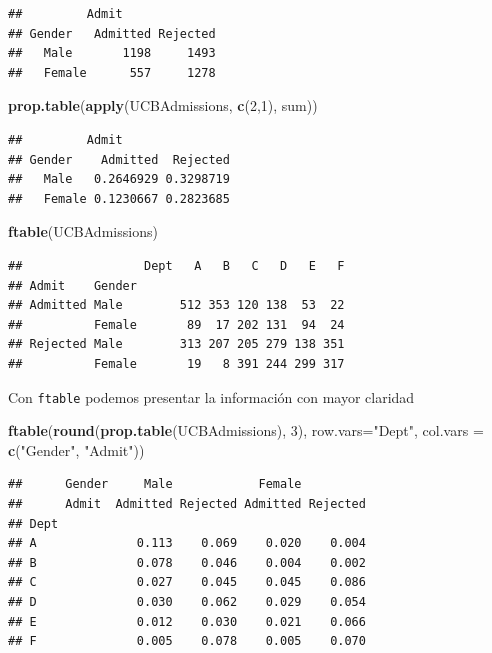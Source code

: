 \documentclass[]{article}
\newenvironment{Shaded}{\begin{snugshade}}{\end{snugshade}}
\newcommand{\KeywordTok}[1]{\textcolor[rgb]{0.13,0.29,0.53}{\textbf{{#1}}}}
\newcommand{\DataTypeTok}[1]{\textcolor[rgb]{0.13,0.29,0.53}{{#1}}}
\newcommand{\DecValTok}[1]{\textcolor[rgb]{0.00,0.00,0.81}{{#1}}}
\newcommand{\StringTok}[1]{\textcolor[rgb]{0.31,0.60,0.02}{{#1}}}
\newcommand{\NormalTok}[1]{{#1}}
\numberwithin{equation}{section}
\begin{document}
\begin{verbatim}
##         Admit
## Gender   Admitted Rejected
##   Male       1198     1493
##   Female      557     1278
\end{verbatim}

\begin{Shaded}
\begin{Highlighting}[]
\KeywordTok{prop.table}\NormalTok{(}\KeywordTok{apply}\NormalTok{(UCBAdmissions, }\KeywordTok{c}\NormalTok{(}\DecValTok{2}\NormalTok{,}\DecValTok{1}\NormalTok{), sum))}
\end{Highlighting}
\end{Shaded}

\begin{verbatim}
##         Admit
## Gender    Admitted  Rejected
##   Male   0.2646929 0.3298719
##   Female 0.1230667 0.2823685
\end{verbatim}

\begin{Shaded}
\begin{Highlighting}[]
\KeywordTok{ftable}\NormalTok{(UCBAdmissions)}
\end{Highlighting}
\end{Shaded}

\begin{verbatim}
##                 Dept   A   B   C   D   E   F
## Admit    Gender                             
## Admitted Male        512 353 120 138  53  22
##          Female       89  17 202 131  94  24
## Rejected Male        313 207 205 279 138 351
##          Female       19   8 391 244 299 317
\end{verbatim}

Con \texttt{ftable} podemos presentar la información con mayor claridad

\begin{Shaded}
\begin{Highlighting}[]
\KeywordTok{ftable}\NormalTok{(}\KeywordTok{round}\NormalTok{(}\KeywordTok{prop.table}\NormalTok{(UCBAdmissions), }\DecValTok{3}\NormalTok{),}
       \DataTypeTok{row.vars=}\StringTok{"Dept"}\NormalTok{, }\DataTypeTok{col.vars =} \KeywordTok{c}\NormalTok{(}\StringTok{"Gender"}\NormalTok{, }\StringTok{"Admit"}\NormalTok{))}
\end{Highlighting}
\end{Shaded}

\begin{verbatim}
##      Gender     Male            Female         
##      Admit  Admitted Rejected Admitted Rejected
## Dept                                           
## A              0.113    0.069    0.020    0.004
## B              0.078    0.046    0.004    0.002
## C              0.027    0.045    0.045    0.086
## D              0.030    0.062    0.029    0.054
## E              0.012    0.030    0.021    0.066
## F              0.005    0.078    0.005    0.070
\end{verbatim}
\end{document}
